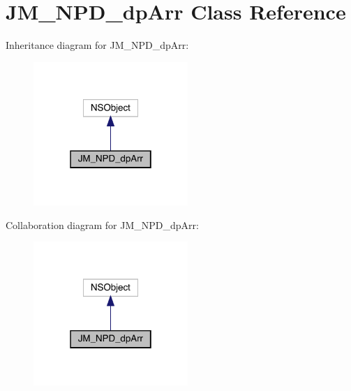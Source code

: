 \hypertarget{interface_j_m___n_p_d__dp_arr}{}\section{J\+M\+\_\+\+N\+P\+D\+\_\+dp\+Arr Class Reference}
\label{interface_j_m___n_p_d__dp_arr}


Inheritance diagram for J\+M\+\_\+\+N\+P\+D\+\_\+dp\+Arr\+:\nopagebreak
\begin{figure}[H]
\begin{center}
\leavevmode
\includegraphics[width=166pt]{interface_j_m___n_p_d__dp_arr__inherit__graph}
\end{center}
\end{figure}


Collaboration diagram for J\+M\+\_\+\+N\+P\+D\+\_\+dp\+Arr\+:\nopagebreak
\begin{figure}[H]
\begin{center}
\leavevmode
\includegraphics[width=166pt]{interface_j_m___n_p_d__dp_arr__coll__graph}
\end{center}
\end{figure}
